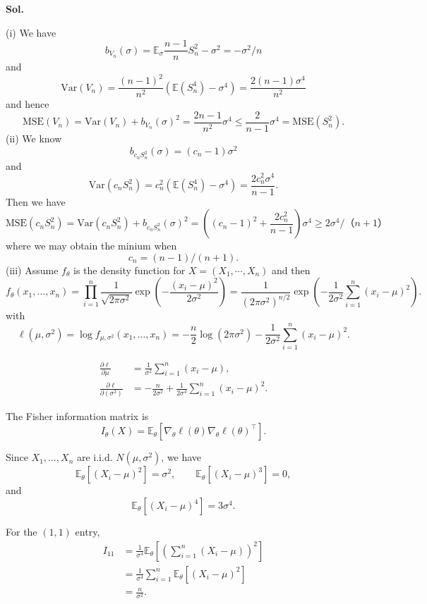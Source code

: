 \documentclass[lang=en,11pt,a4paper,citestyle=authoryear,nobib=true]{elegantpaper}
\begin{document}
\par\vspace{0.5em}\noindent\textbf{Sol.}\par
(i) We have
\[
b_{V_n}(\sigma) = \mathbb E_{\sigma}\dfrac{n-1}{n}S_n^2 - \sigma^2 = -\sigma^2/n
\]
and
\[
\text{Var}(V_n) = \dfrac{(n-1)^2}{n^2}\left(\mathbb{E}(S_n^4) - \sigma^4\right) = \dfrac{2(n-1)\sigma^4}{n^2}
\]
and hence
\[
\text{MSE}(V_n) = \text{Var}(V_n)+b_{V_n}(\sigma)^2 = \dfrac{2n-1}{n^2}\sigma^4 \leq \dfrac{2}{n-1}\sigma^4 = \text{MSE}(S_n^2).
\]
(ii) We know
\[b_{c_nS_n^2}(\sigma) = (c_n-1)\sigma^2\]
and
\[\text{Var}(c_nS_n^2) = c_n^2(\mathbb{E}(S_n^4) - \sigma^4) = \dfrac{2c_n^2\sigma^4}{n-1}.\]
Then we have
\[
\text{MSE}(c_nS_n^2) = \text{Var}(c_nS_n^2) + b_{c_nS_n^2}(\sigma)^2 = \left((c_n-1)^2 + \dfrac{2c_n^2}{n-1}\right)\sigma^4 \geq 2\sigma^4/（n+1）
\]
where we may obtain the minium when
\[
c_n = (n-1)/(n+1).
\]
(iii) Assume $f_{\theta}$ is the density function for $X = (X_1,\cdots,X_n)$ and then
\[
f_{\theta}(x_1,\ldots,x_n)
=
\prod_{i=1}^n
\frac{1}{\sqrt{2\pi\sigma^2}}
\exp\left(-\frac{(x_i-\mu)^2}{2\sigma^2}\right)
=
\frac{1}{(2\pi\sigma^2)^{n/2}}
\exp\left(
-\frac{1}{2\sigma^2}
\sum_{i=1}^n(x_i-\mu)^2
\right).
\]
with
\[
\ell(\mu,\sigma^2)
=
\log f_{\mu,\sigma^2}(x_1,\ldots,x_n)
=
-\frac{n}{2}\log(2\pi\sigma^2)
-\frac{1}{2\sigma^2}
\sum_{i=1}^n(x_i-\mu)^2.
\]

\begin{align*}
\frac{\partial \ell}{\partial \mu}
&=
\frac{1}{\sigma^2}
\sum_{i=1}^n(x_i-\mu),
\\[6pt]
\frac{\partial \ell}{\partial (\sigma^2)}
&=
-\frac{n}{2\sigma^2}
+
\frac{1}{2\sigma^4}
\sum_{i=1}^n(x_i-\mu)^2.
\end{align*}

The Fisher information matrix is
\[
I_\theta(X)
=
\mathbb E_\theta
\left[
\nabla_\theta\ell(\theta)
\nabla_\theta\ell(\theta)^\top
\right].
\]

Since $X_1,\ldots,X_n$ are i.i.d.
$N(\mu,\sigma^2)$, we have
\[
\mathbb E_\theta[(X_i-\mu)^2]=\sigma^2,
\qquad
\mathbb E_\theta[(X_i-\mu)^3]=0,
\]
and
\[
\mathbb E_\theta[(X_i-\mu)^4]=3\sigma^4.
\]

For the $(1,1)$ entry,
\begin{align*}
I_{11}
&=
\frac{1}{\sigma^4}
\mathbb E_\theta
\left[
\left(\sum_{i=1}^n(X_i-\mu)\right)^2
\right]
\\
&=
\frac{1}{\sigma^4}
\sum_{i=1}^n
\mathbb E_\theta[(X_i-\mu)^2]
\\
&=
\frac{n}{\sigma^2}.
\end{align*}
\end{document}
